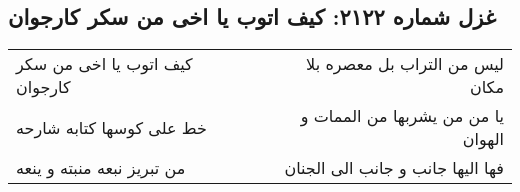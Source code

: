 \begin{center}
\section*{غزل شماره ۲۱۲۲: کیف اتوب یا اخی من سکر کارجوان}
\label{sec:2122}
\begin{longtable}{l p{0.5cm} r}
کیف اتوب یا اخی من سکر کارجوان
&&
لیس من التراب بل معصره بلا مکان
\\
خط علی کوسها کتابه شارحه
&&
یا من من یشربها من الممات و الهوان
\\
من تبریز نبعه منبته و ینعه
&&
فها الیها جانب و جانب الی الجنان
\\
\end{longtable}
\end{center}
